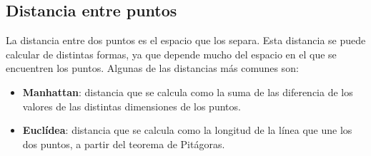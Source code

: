\subsection{Distancia entre puntos}
La distancia entre dos puntos es el espacio que los separa. Esta distancia se puede calcular de distintas formas, ya que depende mucho del espacio en el que se encuentren los puntos. Algunas de las distancias más comunes son:
\begin{itemize}
	\item \textbf{Manhattan}: distancia que se calcula como la suma de las diferencia de los valores de las distintas dimensiones de los puntos.
	\item \textbf{Euclídea}: distancia que se calcula como la longitud de la línea que une los dos puntos, a partir del teorema de Pitágoras.
\end{itemize}
